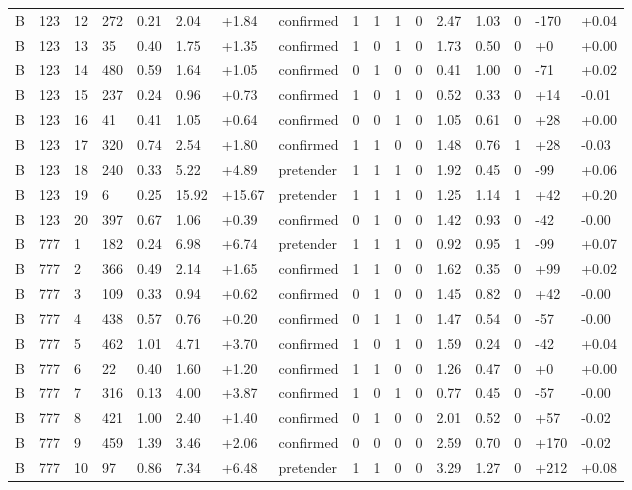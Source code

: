 \documentclass[11pt,a4paper]{article}
\begin{document}
{\begin{longtable}[]{@{}lllllllllllllllll@{}}
B & 123 & 12 & 272 & 0.21 & 2.04 & +1.84 & confirmed & 1 & 1 & 1 & 0 & 2.47 & 1.03 & 0 & -170 & +0.04 \\
B & 123 & 13 & 35 & 0.40 & 1.75 & +1.35 & confirmed & 1 & 0 & 1 & 0 & 1.73 & 0.50 & 0 & +0 & +0.00 \\
B & 123 & 14 & 480 & 0.59 & 1.64 & +1.05 & confirmed & 0 & 1 & 0 & 0 & 0.41 & 1.00 & 0 & -71 & +0.02 \\
B & 123 & 15 & 237 & 0.24 & 0.96 & +0.73 & confirmed & 1 & 0 & 1 & 0 & 0.52 & 0.33 & 0 & +14 & -0.01 \\
B & 123 & 16 & 41 & 0.41 & 1.05 & +0.64 & confirmed & 0 & 0 & 1 & 0 & 1.05 & 0.61 & 0 & +28 & +0.00 \\
B & 123 & 17 & 320 & 0.74 & 2.54 & +1.80 & confirmed & 1 & 1 & 0 & 0 & 1.48 & 0.76 & 1 & +28 & -0.03 \\
B & 123 & 18 & 240 & 0.33 & 5.22 & +4.89 & pretender & 1 & 1 & 1 & 0 & 1.92 & 0.45 & 0 & -99 & +0.06 \\
B & 123 & 19 & 6 & 0.25 & 15.92 & +15.67 & pretender & 1 & 1 & 1 & 0 & 1.25 & 1.14 & 1 & +42 & +0.20 \\
B & 123 & 20 & 397 & 0.67 & 1.06 & +0.39 & confirmed & 0 & 1 & 0 & 0 & 1.42 & 0.93 & 0 & -42 & -0.00 \\
B & 777 & 1 & 182 & 0.24 & 6.98 & +6.74 & pretender & 1 & 1 & 1 & 0 & 0.92 & 0.95 & 1 & -99 & +0.07 \\
B & 777 & 2 & 366 & 0.49 & 2.14 & +1.65 & confirmed & 1 & 1 & 0 & 0 & 1.62 & 0.35 & 0 & +99 & +0.02 \\
B & 777 & 3 & 109 & 0.33 & 0.94 & +0.62 & confirmed & 0 & 1 & 0 & 0 & 1.45 & 0.82 & 0 & +42 & -0.00 \\
B & 777 & 4 & 438 & 0.57 & 0.76 & +0.20 & confirmed & 0 & 1 & 1 & 0 & 1.47 & 0.54 & 0 & -57 & -0.00 \\
B & 777 & 5 & 462 & 1.01 & 4.71 & +3.70 & confirmed & 1 & 0 & 1 & 0 & 1.59 & 0.24 & 0 & -42 & +0.04 \\
B & 777 & 6 & 22 & 0.40 & 1.60 & +1.20 & confirmed & 1 & 1 & 0 & 0 & 1.26 & 0.47 & 0 & +0 & +0.00 \\
B & 777 & 7 & 316 & 0.13 & 4.00 & +3.87 & confirmed & 1 & 0 & 1 & 0 & 0.77 & 0.45 & 0 & -57 & -0.00 \\
B & 777 & 8 & 421 & 1.00 & 2.40 & +1.40 & confirmed & 0 & 1 & 0 & 0 & 2.01 & 0.52 & 0 & +57 & -0.02 \\
B & 777 & 9 & 459 & 1.39 & 3.46 & +2.06 & confirmed & 0 & 0 & 0 & 0 & 2.59 & 0.70 & 0 & +170 & -0.02 \\
B & 777 & 10 & 97 & 0.86 & 7.34 & +6.48 & pretender & 1 & 1 & 0 & 0 & 3.29 & 1.27 & 0 & +212 & +0.08 \\

\end{longtable}}
\end{document}
